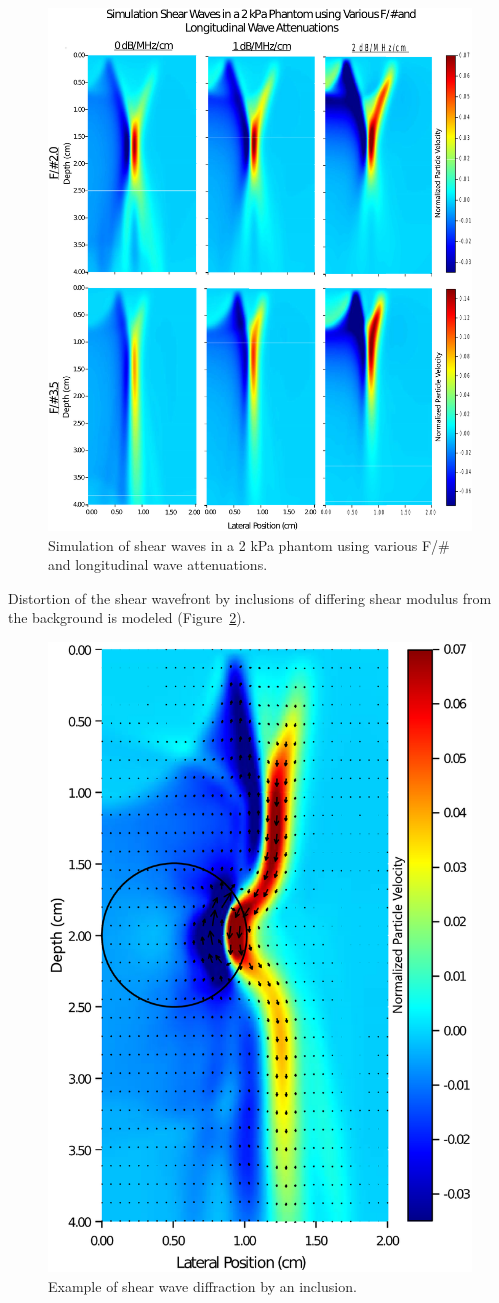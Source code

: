 \begin{figure}[htb!]
    \centering
    \includegraphics[width=0.75\linewidth]{steve/figs/image13.png}
    \caption{Simulation of shear waves in a 2 kPa phantom using various F/\# and
    longitudinal wave attenuations.}
\label{fig:steve-full-wave-results}
\end{figure}

Distortion of the shear wavefront by inclusions of differing shear modulus from
the background is modeled (Figure~\ref{fig:steve-diffraction}). 

\begin{figure}[htb!]
    \centering
    \includegraphics[width=0.5\linewidth]{steve/figs/image14.png}
    \caption{Example of shear wave diffraction by an inclusion.}
\label{fig:steve-diffraction}
\end{figure}

